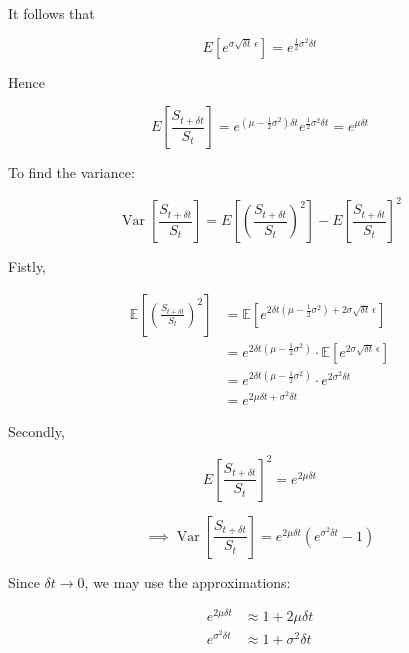 \documentclass{article}
\begin{document}
    It follows that

    \[E\!\left[e^{\sigma \sqrt{\delta t} \, \epsilon}\right] = e^{\frac{1}{2} \sigma^2 \delta t} \]

    Hence

    \begin{equation}
        \label{ev_bintree_dt}
        E\!\left[\frac{S_{t+\delta t}}{S_t}\right] = e^{\left( \mu - \frac{1}{2} \sigma^2 \right) \delta t} e^{\frac{1}{2} \sigma^2 \delta t} = e^{\mu \delta t}
    \end{equation}

    \bigskip

    To find the variance:

    \[\operatorname{Var}\left[\frac{S_{t+\delta t}}{S_t}\right] = E\!\left[\left(\frac{S_{t+\delta t}}{S_t}\right)^2\right] - E\!\left[\frac{S_{t+\delta t}}{S_t}\right]^2\]

    \bigskip

    Fistly,

    \begin{align*}
        \mathbb{E}\!\left[\left(\frac{S_{t+\delta t}}{S_t}\right)^2\right]
        &= \mathbb{E}\!\left[ e^{ 2 \delta t\left( \mu - \frac{1}{2} \sigma^2 \right) + 2 \sigma \sqrt{\delta t} \, \epsilon} \right] \\
        &= e^{2 \delta t\left( \mu - \frac{1}{2} \sigma^2 \right)} \cdot \mathbb{E}\!\left[e^{2 \sigma \sqrt{\delta t} \, \epsilon}\right] \\
        &= e^{2 \delta t\left( \mu - \frac{1}{2} \sigma^2 \right)} \cdot e^{2 \sigma^2 \delta t} \\
        &= e^{2 \mu \delta t + \sigma^2 \delta t}
    \end{align*}

    Secondly,

    \[E\!\left[\frac{S_{t+\delta t}}{S_t}\right]^2 = e^{2 \mu \delta t}\]

    \bigskip

    \[\implies \operatorname{Var}\left[\frac{S_{t+\delta t}}{S_t}\right] = e^{2 \mu \delta t} (e^{\sigma^2 \delta t} - 1)\]

    Since $\delta t \to 0$, we may use the approximations:

    \begin{align*}
        e^{2 \mu \delta t} &\approx 1 + 2 \mu \delta t \\
        e^{\sigma^2 \delta t} &\approx 1 + \sigma^2 \delta t
    \end{align*}
\end{document}
